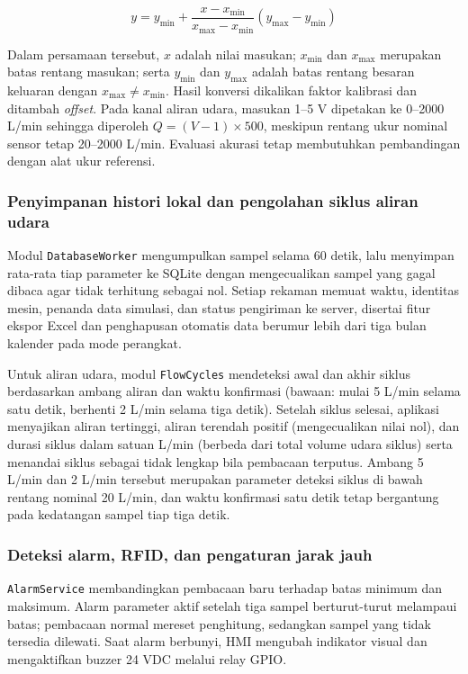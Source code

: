 \begin{equation}\label{eq:konversi}
y=y_{\min}+\frac{x-x_{\min}}{x_{\max}-x_{\min}}(y_{\max}-y_{\min})
\end{equation}

Dalam persamaan tersebut, \(x\) adalah nilai masukan; \(x_{\min}\) dan \(x_{\max}\) merupakan batas rentang masukan; serta \(y_{\min}\) dan \(y_{\max}\) adalah batas rentang besaran keluaran dengan \(x_{\max}\ne x_{\min}\). Hasil konversi dikalikan faktor kalibrasi dan ditambah \textit{offset}. Pada kanal aliran udara, masukan 1--5 V dipetakan ke 0--2000 L/min sehingga diperoleh \(Q=(V-1)\times 500\), meskipun rentang ukur nominal sensor tetap 20--2000 L/min. Evaluasi akurasi tetap membutuhkan pembandingan dengan alat ukur referensi.

\subsubsection{Penyimpanan histori lokal dan pengolahan siklus aliran udara}

Modul \texttt{DatabaseWorker} mengumpulkan sampel selama 60 detik, lalu menyimpan rata-rata tiap parameter ke SQLite dengan mengecualikan sampel yang gagal dibaca agar tidak terhitung sebagai nol. Setiap rekaman memuat waktu, identitas mesin, penanda data simulasi, dan status pengiriman ke server, disertai fitur ekspor Excel dan penghapusan otomatis data berumur lebih dari tiga bulan kalender pada mode perangkat.

Untuk aliran udara, modul \texttt{FlowCycles} mendeteksi awal dan akhir siklus berdasarkan ambang aliran dan waktu konfirmasi (bawaan: mulai 5 L/min selama satu detik, berhenti 2 L/min selama tiga detik). Setelah siklus selesai, aplikasi menyajikan aliran tertinggi, aliran terendah positif (mengecualikan nilai nol), dan durasi siklus dalam satuan L/min (berbeda dari total volume udara siklus) serta menandai siklus sebagai tidak lengkap bila pembacaan terputus. Ambang 5 L/min dan 2 L/min tersebut merupakan parameter deteksi siklus di bawah rentang nominal 20 L/min, dan waktu konfirmasi satu detik tetap bergantung pada kedatangan sampel tiap tiga detik.

\subsubsection{Deteksi alarm, RFID, dan pengaturan jarak jauh}

\texttt{AlarmService} membandingkan pembacaan baru terhadap batas minimum dan maksimum. Alarm parameter aktif setelah tiga sampel berturut-turut melampaui batas; pembacaan normal mereset penghitung, sedangkan sampel yang tidak tersedia dilewati. Saat alarm berbunyi, HMI mengubah indikator visual dan mengaktifkan buzzer 24 VDC melalui relay GPIO.

